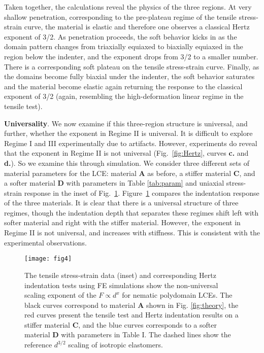 \documentclass[12pt]{article}
\begin{document}
Taken together, the calculations reveal the physics of the three regions.  At very shallow penetration, corresponding to the pre-plateau regime of the tensile stress-strain curve, the material is elastic and therefore one observes a classical Hertz exponent of 3/2.  As penetration proceeds, the soft behavior kicks in as the domain pattern changes from triaxially equiaxed to biaxially equiaxed in the region below the indenter, and the exponent drops from 3/2 to a smaller number. There is a corresponding soft plateau on the tensile stress-strain curve. Finally, as the domains become fully biaxial under the indenter, the soft behavior saturates and the material become elastic again returning the response to the classical exponent of 3/2 (again, resembling the high-deformation linear regime in the tensile test).

 \vspace{0.15cm}
 \textbf{Universality}. We now examine if this three-region structure is universal, and further, whether the exponent in Regime II is universal.  It is difficult to explore Regime I and III experimentally due to artifacts.  However, experiments do reveal that the exponent in Regime II is not universal (Fig.~\ref{fig:Hertz}, curves \textbf{c.} and \textbf{d.}).  
So we examine this through simulation.  We consider three different sets of material parameters for the LCE: 
material $\textbf{A}$ as before, a stiffer material $\textbf{C}$, and a softer material $\textbf{D}$ with parameters in Table \ref{tab:param} and uniaxial stress-strain response in the inset of Fig.~\ref{fig:nonuniversality}.   Figure~\ref{fig:nonuniversality} compares the indentation response of the three materials.  It is clear that there is a universal structure of three regimes, though the indentation depth that separates these regimes shift left with softer material and right with the stiffer material.  However, the exponent in Regime II is not universal, and increases with stiffness.  This is consistent with the experimental observations.


 \begin{figure}[t]
 \centering
\texttt{[image: fig4]}
\caption{The tensile stress-strain data (inset) and corresponding Hertz indentation tests using FE simulations show the non-universal scaling exponent of the $F \propto d^{x}$ for nematic polydomain LCEs. The black curves correspond to material $\textbf{A}$ shown in Fig. \ref{fig:theory}, the red curves present the tensile test and Hertz indentation results on a stiffer material $\textbf{C}$, and the blue curves corresponds to a softer material $\textbf{D}$ with parameters in Table I. The dashed lines show the reference $d^{3/2}$ scaling of isotropic elastomers.}
\label{fig:nonuniversality}
\end{figure}
\end{document}

